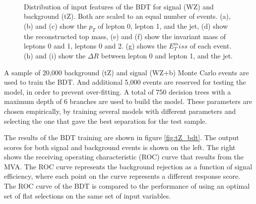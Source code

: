 \begin{figure}[h!]
\center
    \\
    \\
    \\                          
    
    \caption{Distribution of input features of the BDT for signal (WZ) and background (tZ). Both are scaled to an equal number of events. (a), (b) and (c) show the $p_T$ of lepton 0, lepton 1, and the jet, (d) show the reconstructed top mass, (e) and (f) show the invariant mass of leptons 0 and 1, leptons 0 and 2. (g) shows the $E_T^miss$ of each event. (h) and (i) show the $\Delta R$ between lepton 0 and lepton 1, and the jet.}
    \label{fig:tZ_kinematics}
\end{figure}

A sample of 20,000 background (tZ) and signal (WZ+b) Monte Carlo events are used to train the BDT. And additional 5,000 events are reserved for testing the model, in order to prevent over-fitting. A total of 750 decision trees with a maximum depth of 6 branches are used to build the model. These parameters are chosen empirically, by training several models with different parameters and selecting the one that gave the best separation for the test sample. 

The results of the BDT training are shown in figure \ref{fig:tZ_bdt}. The output scores for both signal and background events is shown on the left. The right shows the receiving operating characteristic (ROC) curve that results from the MVA. The ROC curve represents the background rejection as a function of signal efficiency, where each point on the curve represents a different response score. The ROC curve of the BDT is compared to the performance of using an optimal set of flat selections on the same set of input variables.

